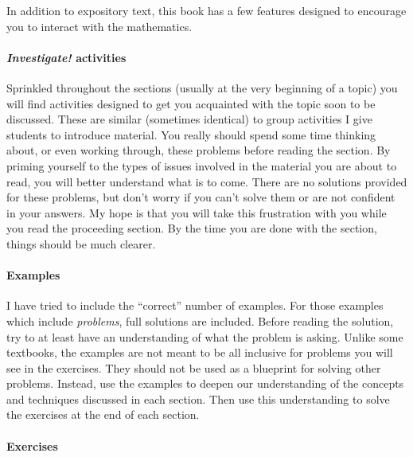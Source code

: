 \documentclass[10pt,]{memoir}
\theoremstyle{plain}
\theoremstyle{definition}
\theoremstyle{definition}
\theoremstyle{definition}
\numberwithin{equation}{chapter}
\begin{document}
  In addition to expository text, this book has a few features designed to encourage you to interact with the mathematics.
\typeout{************************************************}
\typeout{************************************************}
\paragraph[\emph{Investigate!} activities]{\emph{Investigate!} activities}\label{paragraphs-2}

  Sprinkled throughout the sections (usually at the very beginning of a topic) you will find activities designed to get you acquainted with the topic soon to be discussed. These are similar (sometimes identical) to group activities I give students to introduce material. You really should spend some time thinking about, or even working through, these problems before reading the section. By priming yourself to the types of issues involved in the material you are about to read, you will better understand what is to come. There are no solutions provided for these problems, but don't worry if you can't solve them or are not confident in your answers. My hope is that you will take this frustration with you while you read the proceeding section. By the time you are done with the section, things should be much clearer.
\typeout{************************************************}
\typeout{************************************************}
\paragraph[Examples]{Examples}\label{paragraphs-3}

  I have tried to include the ``correct'' number of examples. For those examples which include \emph{problems}, full solutions are included. Before reading the solution, try to at least have an understanding of what the problem is asking. Unlike some textbooks, the examples are not meant to be all inclusive for problems you will see in the exercises. They should not be used as a blueprint for solving other problems. Instead, use the examples to deepen our understanding of the concepts and techniques discussed in each section. Then use this understanding to solve the exercises at the end of each section.
\typeout{************************************************}
\typeout{************************************************}
\paragraph[Exercises]{Exercises}\label{paragraphs-4}
\end{document}
